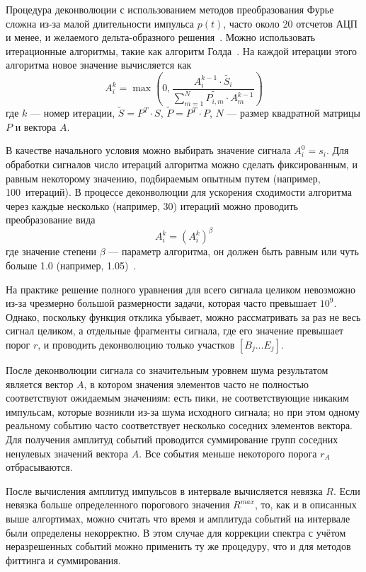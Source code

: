 Процедура деконволюции с использованием методов преобразования Фурье сложна из-за малой длительности импульса $p(t)$, часто около 20 отсчетов АЦП и менее, и желаемого дельта-образного решения~\cite{Morhac2011}. Можно использовать итерационные алгоритмы, такие как алгоритм Голда~\cite{Gold1964}. На каждой итерации этого алгоритма новое значение вычисляется как
\begin{equation*}
  A_i^k = \max \left( 0, \frac{A_i^{k-1} \cdot \widetilde{S_i} }{ \sum_{m=1}^{N} \widetilde{ P_{i,m} } \cdot A_m^{k-1} } \right)
\end{equation*}
где $k$ --- номер итерации, $\widetilde{S} = P^{T} \cdot S $, $\widetilde{P} = P^{T} \cdot P$, $N$ --- размер квадратной матрицы $P$ и вектора $A$.

В качестве начального условия можно выбирать значение сигнала $A_i^0 = s_i$. Для обработки сигналов число итераций алгоритма можно сделать фиксированным, и равным некоторому значению, подбираемым опытным путем (например, 100~итераций). В процессе деконволюции для ускорения сходимости алгоритма через каждые несколько (например, 30) итераций можно проводить преобразование вида 
\begin{equation*}
  A_i^k = \left( A_i^k \right)^{\beta}
\end{equation*}
где значение степени $\beta$ --- параметр алгоритма, он должен быть равным или чуть больше 1.0 (например, 1.05)~\cite{Morhac2011, Khilkevitch2020}.

На практике решение полного уравнения для всего сигнала целиком невозможно из-за чрезмерно большой размерности задачи, которая часто превышает $10^9$. Однако, поскольку функция отклика убывает, можно рассматривать за раз не весь сигнал целиком, а отдельные фрагменты сигнала, где его значение превышает порог $r$, и проводить деконволюцию только участков $\left[ B_j \ldots E_j \right] $.~\cite{Khilkevitch2020} 

После деконволюции сигнала со значительным уровнем шума результатом является вектор $A$, в котором значения элементов часто не полностью соответствуют ожидаемым значениям: есть пики, не соответствующие никаким импульсам, которые возникли из-за шума исходного сигнала; но при этом одному реальному событию часто соответствует несколько соседних элементов вектора. Для получения амплитуд событий проводится суммирование групп соседних ненулевых значений вектора $A$. Все события меньше некоторого порога $r_A$ отбрасываются.

После вычисления амплитуд импульсов в интервале вычисляется невязка $R$. Если невязка больше определенного порогового значения $R^{max}$, то, как и в описанных выше алгортимах, можно считать что время и амплитуда событий на интервале были определены некорректно. В этом случае для коррекции спектра с учётом неразрешенных событий можно применить ту же процедуру, что и для методов фиттинга и суммирования.~\cite{Khilkevitch2020}

